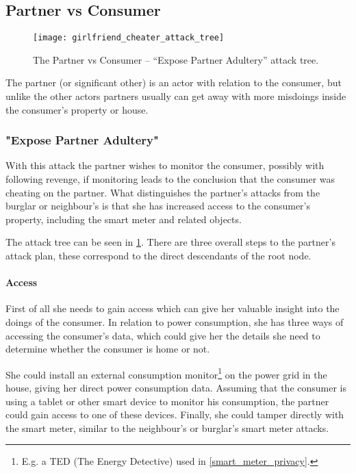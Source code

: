 
\subsection{Partner vs Consumer}

\begin{figure}
	\texttt{[image: girlfriend\_cheater\_attack\_tree]}
	\caption{The Partner vs Consumer -- ``Expose Partner Adultery'' attack tree.}
	\label{fig:attack_trees:partner:cheater}
\end{figure}

The partner (or significant other) is an actor with relation to the consumer, but unlike the other actors partners usually can get away with more misdoings inside the consumer's property or house.

\subsubsection{"Expose Partner Adultery"}

With this attack the partner wishes to monitor the consumer, possibly with following revenge, if monitoring leads to the conclusion that the consumer was cheating on the partner.
What distinguishes the partner's attacks from the burglar or neighbour's is that she has increased access to the consumer's property, including the smart meter and related objects.

The attack tree can be seen in \cref{fig:attack_trees:partner:cheater}.
There are three overall steps to the partner's attack plan, these correspond to the direct descendants of the root node.

\paragraph{Access}
First of all she needs to gain access which can give her valuable insight into the doings of the consumer.
In relation to power consumption, she has three ways of accessing the consumer's data, which could give her the details she need to determine whether the consumer is home or not.

She could install an external consumption monitor\footnote{E.g. a TED (The Energy Detective) used in \cref {smart_meter_privacy}.} on the power grid in the house, giving her direct power consumption data.
Assuming that the consumer is using a tablet or other smart device to monitor his consumption, the partner could gain access to one of these devices.
Finally, she could tamper directly with the smart meter, similar to the neighbour's or burglar's smart meter attacks.

